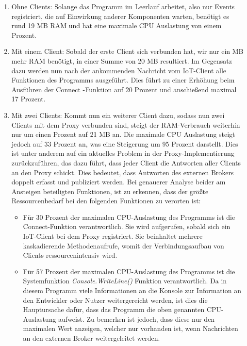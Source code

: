     \begin{enumerate}
        \item Ohne Clients:
        Solange das Programm im Leerlauf arbeitet, also nur Events registriert, die auf Einwirkung anderer Komponenten warten, benötigt es rund 19 \ac{MB} \ac{RAM} und hat eine maximale \ac{CPU} Auslastung von einem Prozent.
        \item Mit einem Client:
        Sobald der erste Client sich verbunden hat, wir nur ein \ac{MB} mehr \ac{RAM} benötigt, in einer Summe von 20 \ac{MB} resultiert. Im Gegensatz dazu werden nun nach der ankommenden Nachricht vom \ac{IoT}-Client alle Funktionen des Programms ausgeführt. Dies führt zu einer Erhöhung beim Ausführen der \glqq Connect\grqq{} -Funktion auf 20 Prozent und anschießend maximal 17 Prozent.
        \item Mit zwei Clients:
        Kommt nun ein weiterer Client dazu, sodass nun zwei Clients mit dem Proxy verbunden sind, steigt der \ac{RAM}-Verbrauch weiterhin nur um einen Prozent auf 21 \ac{MB} an. Die maximale \ac{CPU} Auslastung steigt jedoch auf 33 Prozent an, was eine Steigerung um 95 Prozent darstellt. Dies ist unter anderem auf ein aktuelles Problem in der Proxy-Implementierung %
        zurückzuführen, das dazu führt, dass jeder Client die Antworten aller Clients an den Proxy schickt. Dies bedeutet, dass Antworten des externen Brokers doppelt erfasst und publiziert werden.
        Bei genauerer Analyse beider am Ansteigen beteiligten Funktionen, ist zu erkennen, dass der größte Ressourcenbedarf bei den folgenden Funktionen zu verorten ist:
        \begin{itemize}
            \item Für 30 Prozent der maximalen \ac{CPU}-Auslastung des Programms ist die \glqq Connect\grqq -Funktion verantwortlich. Sie wird aufgerufen, sobald sich ein \ac{IoT}-Client bei dem Proxy registriert. Sie beinhaltet mehrere kaskadierende Methodenaufrufe, womit der Verbindungsaufbau von Clients ressourcenintensiv wird.  
            \item Für 57 Prozent der maximalen \ac{CPU}-Auslastung des Programms ist die Systemfunktion \emph{Console.WriteLine()} Funktion verantwortlich. Da in diesem Programm viele Informationen an die Konsole zur Information an den Entwickler oder Nutzer weitergereicht werden, ist dies die Hauptursache dafür, dass das Programm die oben genannten \ac{CPU}-Auslastung aufweist. Zu bemerken ist jedoch, dass diese nur den maximalen Wert anzeigen, welcher nur vorhanden ist, wenn Nachrichten an den externen Broker weitergeleitet werden.
        \end{itemize}
    \end{enumerate}
